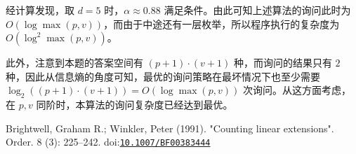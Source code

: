 \documentclass[12pt]{ctexart}
\begin{document}
经计算发现，取 $d=5$ 时，$\alpha \approx 0.88$ 满足条件。由此可知上述算法的询问此时为 $O(\log \max (p, v))$，而由于中途还有一层枚举，所以程序执行的复杂度为 $O(\log^2 \max(p, v))$。

此外，注意到本题的答案空间有 $(p+1)\cdot (v+1)$ 种，而询问的结果只有 $2$ 种，因此从信息熵的角度可知，最优的询问策略在最坏情况下也至少需要 $\log_2 ((p+1)\cdot (v+1)) = O (\log \max (p, v))$ 次询问。从这方面考虑，在 $p,v$ 同阶时，本算法的询问复杂度已经达到最优。

\newpage

\begin{thebibliography}{}
 Brightwell, Graham R.; Winkler, Peter (1991). "Counting linear extensions". Order. 8 (3): 225–242. doi:\href{https://doi.org/10.1007\%2FBF00383444}{\texttt{10.1007/BF00383444}}
\end{thebibliography}
\end{document}
